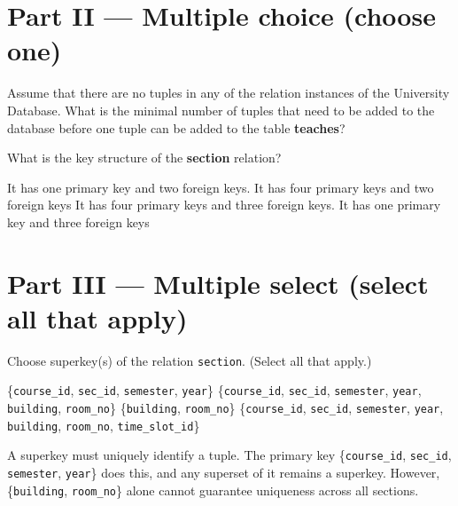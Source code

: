\documentclass[12pt,answers]{exam}
\begin{document}
\begin{questions}
\section*{Part II — Multiple choice (choose one)}

\begin{minipage}{\linewidth}
\question[3]
Assume that there are no tuples in any of the relation instances of the University Database. 
What is the minimal number of tuples that need to be added to the database before one tuple 
can be added to the table \textbf{teaches}?

\begin{checkboxes}
\end{checkboxes}
\end{minipage}

\begin{minipage}{\linewidth}
\question[3]
What is the key structure of the \textbf{section} relation?

\begin{checkboxes}
    \CorrectChoice It has one primary key and two foreign keys.
    \choice It has four primary keys and two foreign keys
    \choice It has four primary keys and three foreign keys.
    \choice It has one primary key and three foreign keys
\end{checkboxes}
\end{minipage}

\section*{Part III — Multiple select (select all that apply)}

\begin{minipage}{\linewidth}
\question[4]
Choose superkey(s) of the relation \texttt{section}. (Select all that apply.)

\begin{checkboxes}
    \CorrectChoice \{\texttt{course\_id}, \texttt{sec\_id}, \texttt{semester}, \texttt{year}\}
    \CorrectChoice \{\texttt{course\_id}, \texttt{sec\_id}, \texttt{semester}, \texttt{year}, \texttt{building}, \texttt{room\_no}\}
    \choice \{\texttt{building}, \texttt{room\_no}\}
    \CorrectChoice \{\texttt{course\_id}, \texttt{sec\_id}, \texttt{semester}, \texttt{year}, \texttt{building}, \texttt{room\_no}, \texttt{time\_slot\_id}\}
\end{checkboxes}
\begin{solution}
A superkey must uniquely identify a tuple.  
The primary key \{\texttt{course\_id}, \texttt{sec\_id}, \texttt{semester}, \texttt{year}\} does this, 
and any superset of it remains a superkey.  
However, \{\texttt{building}, \texttt{room\_no}\} alone cannot guarantee uniqueness across all sections.
\end{solution}
\end{minipage}


\end{questions}
\end{document}
